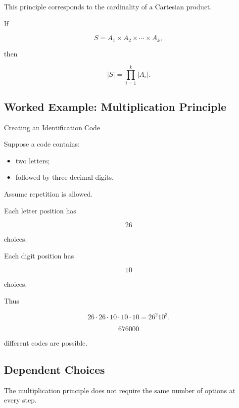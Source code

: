 This principle corresponds to the cardinality of a Cartesian product.

If

\[
S=A_1\times A_2\times\cdots\times A_k,
\]

then

\[
\boxed{
|S|
=
\prod_{i=1}^{k}|A_i|.
}
\]

\subsection{Worked Example: Multiplication Principle}
\label{subsec:worked-multiplication-principle}

\begin{workedexamplebox}{Creating an Identification Code}

Suppose a code contains:

\begin{itemize}
    \item two letters;
    \item followed by three decimal digits.
\end{itemize}

Assume repetition is allowed.

Each letter position has

\[
26
\]

choices.

Each digit position has

\[
10
\]

choices.

Thus

\[
26\cdot26\cdot10\cdot10\cdot10
=
26^2 10^3.
\]

\begin{answerbox}
\[
\boxed{
676000
}
\]

different codes are possible.
\end{answerbox}

\end{workedexamplebox}

\subsection{Dependent Choices}
\label{subsec:dependent-choices}

The multiplication principle does not require the same number of
options at every step.

